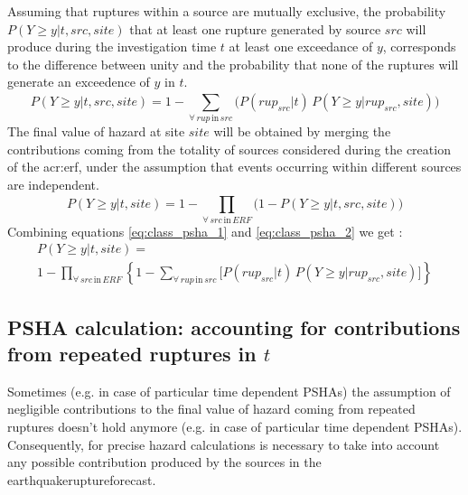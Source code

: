 Assuming that ruptures within a source are mutually exclusive, 
the probability $P(Y\geq y|t,src,site)$ that at least one rupture 
generated by source $src$ will produce during the investigation 
time $t$ at least one exceedance of $y$, corresponds to the 
difference between unity and the probability that none of the 
ruptures will generate an exceedence of $y$ in $t$.
\begin{equation}
P(Y\geq y|t,src,site) = 1 - \sum_{\forall\,rup\,\text{in}\,src}^{} 
	\Big( P(rup_{src}|t)\,
	P(Y\geq y|rup_{src},site) \Big)
\label{eq:class_psha_1}
\end{equation}
The final value of hazard at site $site$ will be obtained by 
merging the contributions coming from the totality of sources 
considered during the creation of the \gls{acr:erf}, under the 
assumption that events occurring within different sources are 
independent.
%
\begin{equation}
P(Y \geq y|t,site) = 1 - \prod_{\forall\,src\,\text{in}\,ERF}^{} 
\Big( 1-P(Y\geq y|t,src,site) \Big) \label{eq:class_psha_2}
\end{equation}
%
Combining equations \ref{eq:class_psha_1} and \ref{eq:class_psha_2} 
we get \cite[see also][equation 4, page 410]{field2003}:
%
\begin{multline}
P(Y \geq y|t,site) = \\
	1-\prod\limits_{\forall\,src\,\text{in}\,ERF}^{}  
	\left\{
		1-\sum\limits_{\forall\,rup\,\text{in}\,src}^{} 
			\biggl[ P(rup_{src}|t)\,P(Y\geq y|rup_{src},site)
			\biggr]
	\right\}
\label{eq:PSHA_calc_classical_no_repeating}
\end{multline}
%
\subsection{PSHA calculation: accounting for contributions from 
repeated ruptures in $t$}
%
Sometimes  (e.g. in case of particular time dependent PSHAs) the 
assumption of negligible contributions to the final value 
of hazard coming from repeated ruptures doesn't hold anymore (e.g. in 
case of particular time dependent PSHAs). 
%
Consequently, for precise hazard calculations is necessary to take 
into account any possible contribution produced by the sources in the
\gls{earthquakeruptureforecast}.

